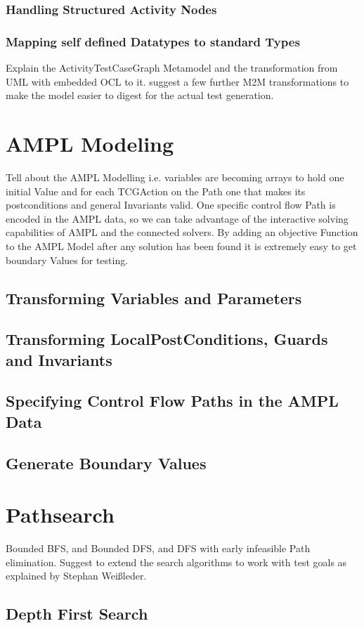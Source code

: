 \subsubsection{Handling Structured Activity Nodes}
\subsubsection{Mapping self defined Datatypes to standard Types}
Explain the ActivityTestCaseGraph Metamodel and the transformation from UML with embedded OCL to it. 
suggest a few further M2M transformations to make the model easier to digest for the actual test generation.
\section{AMPL Modeling}
Tell about the AMPL Modelling i.e. variables are becoming arrays to hold one initial Value and for each TCGAction on the Path one that makes its postconditions and general Invariants valid. One specific control flow Path is encoded in the AMPL data, so we can take advantage of the interactive solving capabilities of AMPL and the connected solvers.
By adding an objective Function to the AMPL Model after any solution has been found it is extremely easy to get boundary Values for testing.
\subsection{Transforming Variables and Parameters}
\subsection{Transforming LocalPostConditions, Guards and Invariants}
\subsection{Specifying Control Flow Paths in the AMPL Data}
\subsection{Generate Boundary Values}
\section{Pathsearch}
Bounded BFS, and Bounded DFS, and DFS with early infeasible Path elimination.
Suggest to extend the search algorithms to work with test goals as explained by Stephan Weißleder.
\subsection{Depth First Search}
